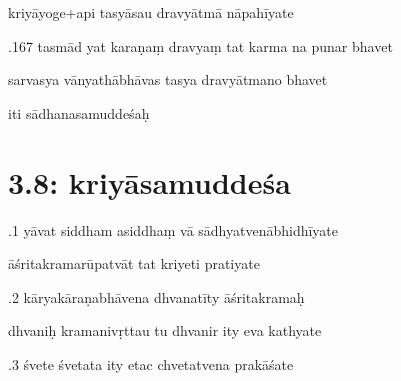 \documentclass[article,12pt,a4paper]{memoir}%
\newcounter{parCount}
\begin{document}
	  
	  \pstart \leavevmode%
	kriyāyoge+api tasyāsau dravyātmā nāpahīyate 
	{}
	\pend%
      

	  
	  \pstart {}.167 tasmād yat karaṇaṃ dravyaṃ tat karma na punar bhavet 
	{}
	\pend%
      

	  
	  \pstart \leavevmode%
	sarvasya vānyathābhāvas tasya dravyātmano bhavet 
	{}
	\pend%
      

	  
	  \pstart \leavevmode%
	iti sādhanasamuddeśaḥ
	{}
	\pend%
      
	  
	
\chapter[{3.8: kriyāsamuddeśa}][{3.8: kriyāsamuddeśa}]{ 3.8: kriyāsamuddeśa}

	  
	  \pstart {}.1 yāvat siddham asiddhaṃ vā   sādhyatvenābhidhīyate 
	{}
	\pend%
      

	  
	  \pstart \leavevmode%
	āśritakramarūpatvāt tat kriyeti pratiyate 
	{}
	\pend%
      

	  
	  \pstart {}.2 kāryakāraṇabhāvena dhvanatīty āśritakramaḥ 
	{}
	\pend%
      

	  
	  \pstart \leavevmode%
	dhvaniḥ kramanivṛttau tu dhvanir ity eva kathyate 
	{}
	\pend%
      

	  
	  \pstart {}.3 śvete śvetata ity etac chvetatvena prakāśate 
	{}
	\pend%
      
\end{document}
